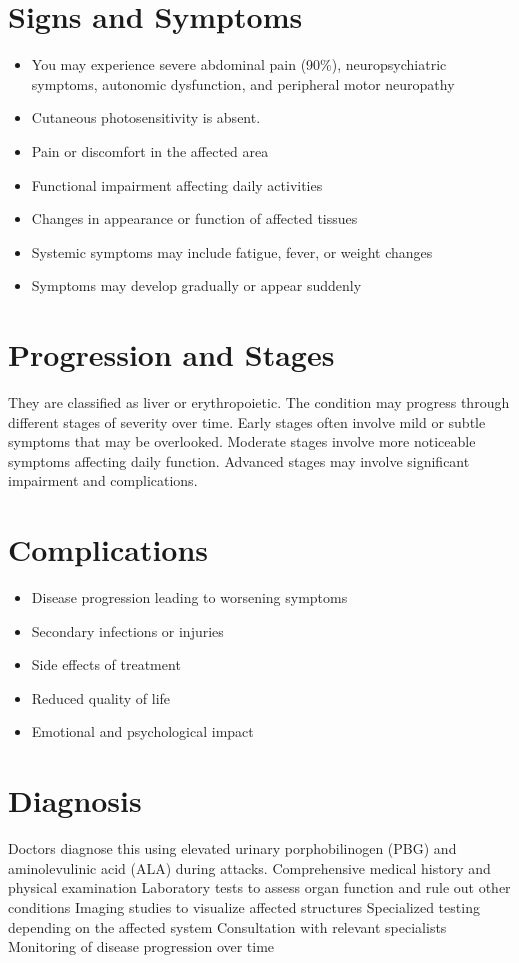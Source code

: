 \section{Signs and Symptoms}
\begin{itemize}[noitemsep]
  \item You may experience severe abdominal pain (90\%), neuropsychiatric symptoms, autonomic dysfunction, and peripheral motor neuropathy
  \item Cutaneous photosensitivity is absent.
  \item Pain or discomfort in the affected area
  \item Functional impairment affecting daily activities
  \item Changes in appearance or function of affected tissues
  \item Systemic symptoms may include fatigue, fever, or weight changes
  \item Symptoms may develop gradually or appear suddenly
\end{itemize}
\section{Progression and Stages}
They are classified as liver or erythropoietic. The condition may progress through different stages of severity over time. Early stages often involve mild or subtle symptoms that may be overlooked. Moderate stages involve more noticeable symptoms affecting daily function. Advanced stages may involve significant impairment and complications.
\section{Complications}
\begin{itemize}[noitemsep]
  \item Disease progression leading to worsening symptoms
  \item Secondary infections or injuries
  \item Side effects of treatment
  \item Reduced quality of life
  \item Emotional and psychological impact
\end{itemize}
\section{Diagnosis}
Doctors diagnose this using elevated urinary porphobilinogen (PBG) and aminolevulinic acid (ALA) during attacks. Comprehensive medical history and physical examination Laboratory tests to assess organ function and rule out other conditions Imaging studies to visualize affected structures Specialized testing depending on the affected system Consultation with relevant specialists Monitoring of disease progression over time


